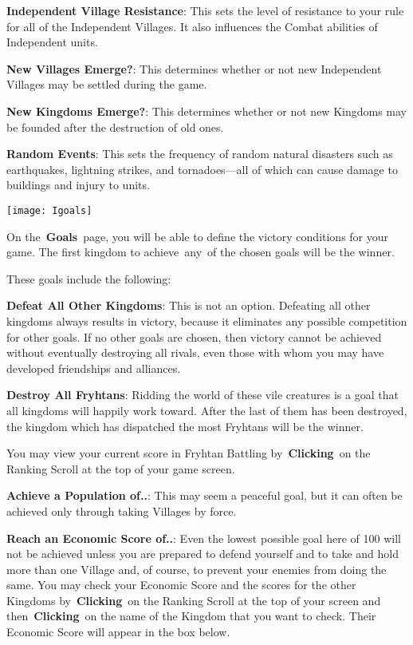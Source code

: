 \textbf{Independent Village Resistance}: This sets the level of resistance to your rule for all of the Independent Villages. It also influences the Combat abilities of Independent units.

\textbf{New Villages Emerge?}: This determines whether or not new Independent Villages may be settled during the game.

\textbf{New Kingdoms Emerge?}: This determines whether or not new Kingdoms may be founded after the destruction of old ones.

\textbf{Random Events}: This sets the frequency of random natural disasters such as earthquakes, lightning strikes, and tornadoes---all of which can cause damage to buildings and injury to units.

\begin{center}
	\texttt{[image: Igoals]}
\end{center}

On the \textbf{Goals} page, you will be able to define the victory conditions for your game. The first kingdom to achieve any of the chosen goals will be the winner.

These goals include the following:

\textbf{Defeat All Other Kingdoms}: This is not an option. Defeating all other kingdoms always results in victory, because it eliminates any possible competition for other goals. If no other goals are chosen, then victory cannot be achieved without eventually destroying all rivals, even those with whom you may have developed friendships and alliances.

\textbf{Destroy All Fryhtans}: Ridding the world of these vile creatures is a goal that all kingdoms will happily work toward. After the last of them has been destroyed, the kingdom which has dispatched the most Fryhtans will be the winner.

You may view your current score in Fryhtan Battling by \textbf{Clicking} on the Ranking Scroll at the top of your game screen.

\textbf{Achieve a Population of..}: This may seem a peaceful goal, but it can often be achieved only through taking Villages by force.

\textbf{Reach an Economic Score of..}: Even the lowest possible goal here of 100 will not be achieved unless you are prepared to defend yourself and to take and hold more than one Village and, of course, to prevent your enemies from doing the same. You may check your Economic Score and the scores for the other Kingdoms by \textbf{Clicking} on the Ranking Scroll at the top of your screen and then \textbf{Clicking} on the name of the Kingdom that you want to check. Their Economic Score will appear in the box below.

